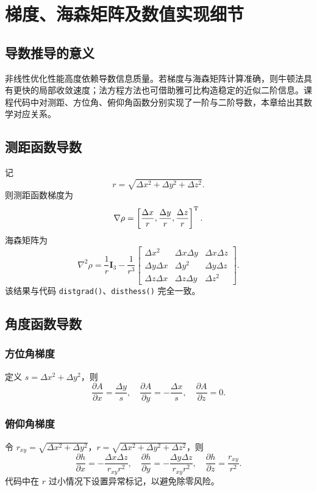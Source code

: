 \chapter{梯度、海森矩阵及数值实现细节}

\section{导数推导的意义}
非线性优化性能高度依赖导数信息质量。若梯度与海森矩阵计算准确，则牛顿法具有更快的局部收敛速度；法方程方法也可借助雅可比构造稳定的近似二阶信息。课程代码中对测距、方位角、俯仰角函数分别实现了一阶与二阶导数，本章给出其数学对应关系。

\section{测距函数导数}
记
\[
r=\sqrt{\Delta x^2+\Delta y^2+\Delta z^2}.
\]
则测距函数梯度为
\begin{equation}
\nabla \rho=
\left[
\frac{\Delta x}{r},
\frac{\Delta y}{r},
\frac{\Delta z}{r}
\right]^{\mathrm{T}}.
\label{eq:dist_grad}
\end{equation}
海森矩阵为
\begin{equation}
\nabla^2\rho=
\frac{1}{r}\bm I_3-\frac{1}{r^3}
\begin{bmatrix}
\Delta x^2 & \Delta x\Delta y & \Delta x\Delta z\\
\Delta y\Delta x & \Delta y^2 & \Delta y\Delta z\\
\Delta z\Delta x & \Delta z\Delta y & \Delta z^2
\end{bmatrix}.
\label{eq:dist_hess}
\end{equation}
该结果与代码 \texttt{distgrad()}、\texttt{disthess()} 完全一致。

\section{角度函数导数}
\subsection{方位角梯度}
定义 $s=\Delta x^2+\Delta y^2$，则
\begin{equation}
\frac{\partial A}{\partial x}=\frac{\Delta y}{s},\quad
\frac{\partial A}{\partial y}=-\frac{\Delta x}{s},\quad
\frac{\partial A}{\partial z}=0.
\end{equation}

\subsection{俯仰角梯度}
令 $r_{xy}=\sqrt{\Delta x^2+\Delta y^2}$，$r=\sqrt{\Delta x^2+\Delta y^2+\Delta z^2}$，则
\begin{equation}
\frac{\partial h}{\partial x}=-\frac{\Delta x\Delta z}{r_{xy}r^2},\quad
\frac{\partial h}{\partial y}=-\frac{\Delta y\Delta z}{r_{xy}r^2},\quad
\frac{\partial h}{\partial z}=\frac{r_{xy}}{r^2}.
\end{equation}
代码中在 $r$ 过小情况下设置异常标记，以避免除零风险。

